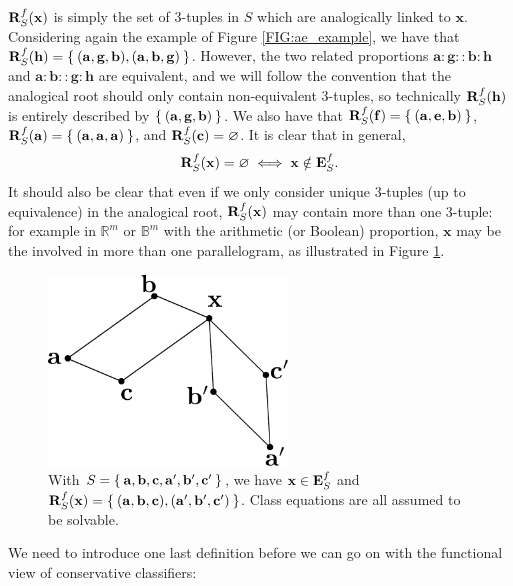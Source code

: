 $\mathbf{R}_{S}^{f}(\mathbf{x})$ is simply the set of 3-tuples in $S$ which are analogically linked to
$\mathbf{x}$. Considering again the example of Figure \ref{FIG:ae_example}, we have that
$\mathbf{R}_{S}^{f}(\mathbf{h}) = \Set{(\mathbf{a}, \mathbf{g},\mathbf{b}),
(\mathbf{a}, \mathbf{b},\mathbf{g})}$. However, the two related proportions
$\mathbf{a}: \mathbf{g}::\mathbf{b}:\mathbf{h}$ and $\mathbf{a}:
\mathbf{b}::\mathbf{g}:\mathbf{h}$ are equivalent, and we will follow the
convention that the analogical root should only contain non-equivalent
3-tuples, so technically $\mathbf{R}_{S}^{f}(\mathbf{h})$ is entirely described by $\Set{(\mathbf{a},
\mathbf{g},\mathbf{b})}$.
We also have that $\mathbf{R}_{S}^{f}(\mathbf{f}) = \Set{(\mathbf{a}, \mathbf{e},
\mathbf{b})}$, $\mathbf{R}_{S}^{f}(\mathbf{a}) = \Set{(\mathbf{a}, \mathbf{a},
\mathbf{a})}$, and $\mathbf{R}_{S}^{f}(\mathbf{c}) = \varnothing$. It is clear that
in general,
$$\mathbf{R}_{S}^{f}(\mathbf{x}) = \varnothing\iff \mathbf{x} \notin \mathbf{E}_{S}^{f}.$$
\noindent
It should also be clear that even if we only consider unique 3-tuples (up to
equivalence) in the
analogical root, $\mathbf{R}_{S}^{f}(\mathbf{x})$ may contain more than one 3-tuple: for example in
$\mathbb{R}^m$ or $\mathbb{B}^m$ with the arithmetic (or Boolean) proportion,
$\mathbf{x}$ may be the involved in more than one parallelogram, as illustrated
in Figure \ref{FIG:multiple_parallelograms}.

\begin{figure}[!h]
\centering
  \includegraphics[width=2.5in]{figures/multiple_parallelograms.pdf}
  \caption{With $S = \Set{\mathbf{a}, \mathbf{b}, \mathbf{c}, \mathbf{a}',
  \mathbf{b}', \mathbf{c}'}$, we have $\mathbf{x} \in \mathbf{E}_{S}^{f}$ and $\mathbf{R}_{S}^{f}(\mathbf{x}) =
  \Set{(\mathbf{a}, \mathbf{b}, \mathbf{c}), (\mathbf{a}', \mathbf{b}',
  \mathbf{c}')}$. Class equations are all assumed to be solvable.}
\label{FIG:multiple_parallelograms}
\end{figure}

We need to introduce one last definition before we can go on with the
functional view of conservative classifiers:

